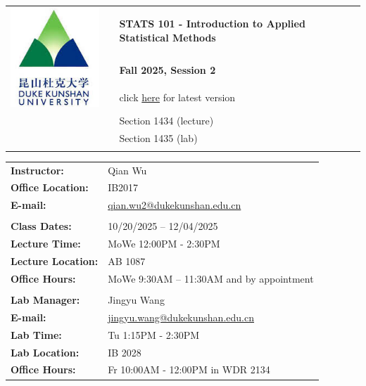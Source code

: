 \documentclass[11pt]{article}
\begin{document}
\noindent \hspace{-4mm} \begin{tabular}{ l c l }
  \multirow{3}{*}{\includegraphics[scale=.5]{logo.jpeg}} && \Large\textbf{STATS 101 - Introduction to Applied Statistical Methods}\\[5pt]
  && \Large \textbf{Fall 2025, Session 2}\\[24pt]
  && click \href{https://qianwu-dku.github.io/STAT101/syllabus/syllabus.pdf}{here} for latest version \\
  && Section 1434 (lecture)\\
  && Section 1435 (lab)\\\\
\end{tabular}

\noindent  \hspace{-4mm}  \begin{tabular}{ l l }
  \textbf{Instructor:} 			& \large Qian Wu \\
  \textbf{Office Location:} 	& \large IB2017\\
  \textbf{E-mail:} 				& \large \href{mailto:qian.wu2@dukekunshan.edu.cn}{qian.wu2@dukekunshan.edu.cn} \\\\
 
  \textbf{Class Dates:}			& 10/20/2025 – 12/04/2025 \\
  \textbf{Lecture Time:}			& \large MoWe 12:00PM - 2:30PM\\
  \textbf{Lecture Location:} 		& \large AB 1087\\
    \textbf{Office Hours:} & \large MoWe 9:30AM -- 11:30AM and by appointment\\
     & \\
 \textbf{Lab Manager: }          & \large{Jingyu Wang} \\
\textbf{E-mail: }          & \large{\href{mailto:jingyu.wang@dukekunshan.edu.cn}{jingyu.wang@dukekunshan.edu.cn}} \\
 \textbf{Lab Time:}              & \large Tu 1:15PM - 2:30PM\\
 \textbf{Lab Location:}          & \large IB 2028\\
 \textbf{Office Hours:} & \large Fr 10:00AM - 12:00PM in WDR 2134\\



\end{tabular}
\end{document}

